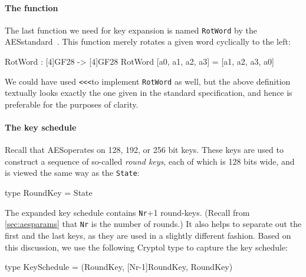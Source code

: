 \paragraph*{The {} function} The last
function we need for key expansion is named {\tt RotWord} by the
AES\indAES standard~\cite[section 5.2]{aes}. This function merely
rotates a given word cyclically to the left:
\begin{code}
  RotWord : [4]GF28 -> [4]GF28
  RotWord [a0, a1, a2, a3] = [a1, a2, a3, a0]
\end{code}
We could have used \verb+<<<+\indRotLeft to implement {\tt RotWord} as
well, but the above definition textually looks exactly the one given
in the standard specification, and hence is preferable for the
purposes of clarity.


\paragraph*{The key schedule} Recall that AES\indAES operates on 128,
192, or 256 bit keys.  These keys are used to construct a sequence of
so-called \emph{round keys}, each of which is 128 bits wide, and is
viewed the same way as the {\tt State}:
\begin{code}
  type RoundKey = State
\end{code}
The expanded key schedule contains {\tt Nr}+1 round-keys.  (Recall
from \autoref{sec:aesparams} that {\tt Nr} is the number of
rounds.)  It also helps to separate out the first and the last keys,
as they are used in a slightly different fashion.  Based on this
discussion, we use the following Cryptol type to capture the
key schedule:
\begin{code}
  type KeySchedule = (RoundKey, [Nr-1]RoundKey, RoundKey) 
\end{code}

